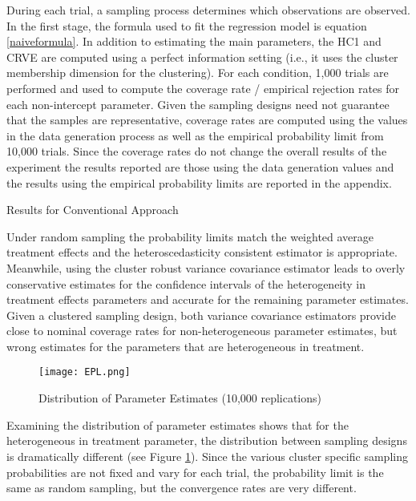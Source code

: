 \documentclass{jbsc}
\begin{document}
During each trial, a sampling process determines which observations are observed. In the first stage, the formula used to fit the regression model is equation \ref{naiveformula}. In addition to estimating the main parameters, the HC1 and CRVE are computed using a perfect information setting (i.e., it uses the cluster membership dimension for the clustering). For each condition, 1,000 trials are performed and used to compute the coverage rate / empirical rejection rates for each non-intercept parameter. Given the sampling designs need not guarantee that the samples are representative, coverage rates are computed using the values in the data generation process as well as the empirical probability limit from 10,000 trials. Since the coverage rates do not change the overall results of the experiment the results reported are those using the data generation values and the results using the empirical probability limits are reported in the appendix.

\begin{table}[hbpt]
	\centering
    \caption{Results for Conventional Approach}
	\label{Conventional}
	
\end{table}

Under random sampling the probability limits match the weighted average treatment effects and the heteroscedasticity consistent estimator is appropriate. Meanwhile, using the cluster robust variance covariance estimator leads to overly conservative estimates for the confidence intervals of the heterogeneity in treatment effects parameters and accurate for the remaining parameter estimates. Given a clustered sampling design, both variance covariance estimators provide close to nominal coverage rates for non-heterogeneous parameter estimates, but wrong estimates for the parameters that are heterogeneous in treatment.

\begin{figure}[hbpt]
	\texttt{[image: EPL.png]}
	\caption{Distribution of Parameter Estimates (10,000 replications)}
	\label{EPL}
\end{figure}

Examining the distribution of parameter estimates shows that for the heterogeneous in treatment parameter, the distribution between sampling designs is dramatically different (see Figure \ref{EPL}). Since the various cluster specific sampling probabilities are not fixed and vary for each trial, the probability limit is the same as random sampling, but the convergence rates are very different.
\end{document}
